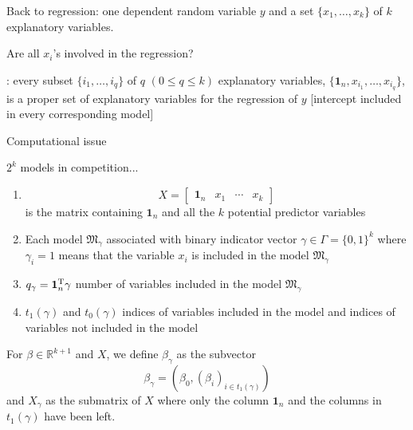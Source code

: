\begin{slide}

Back to regression: one dependent random variable $y$ and a set 
$\{x_1,\ldots,x_k\}$ of $k$ explanatory variables.

\pause
\vs{} Are all $x_i$'s involved in the regression?

\pause
{}: every subset $\{i_1,\ldots,i_q\}$ of 
$q$ $(0\le q\le k)$ explanatory variables, $\{\mathbf{1}_n,x_{i_1},
\ldots,x_{i_q}\}$, is a proper set of explanatory variables for the regression of $y$
[intercept included in every corresponding model] 

\pause
\begin{block}{Computational issue} 
\centerline{$2^k$ models in competition...}
\end{block}

\end{slide}\begin{slide}

\begin{enumerate}
\item $$
X=\left[\begin{matrix}\mathbf{1}_n &x_1 &\cdots &x_k \end{matrix}\right]
$$
is the matrix containing $\mathbf{1}_n$ and all the $k$ potential predictor variables

\item Each model $\mathfrak{M}_\gamma$ associated with binary indicator vector 
$\gamma\in\Gamma=\{0,1\}^k$ where $\gamma_i=1$ means that the variable $x_i$ is included in 
the model $\mathfrak{M}_\gamma$

\item $q_\gamma = \mathbf{1}_n^{\mathrm{T}} \gamma$ number of variables included in the model $\mathfrak{M}_\gamma$

\item $t_1(\gamma)$ and $t_0(\gamma)$ indices of 
variables included in the model and indices of variables not included in the model
\end{enumerate}

\end{slide}\begin{slide}

For $\beta\in\mathbb{R}^{k+1}$ and $X$, 
we define $\beta_\gamma$ as the subvector
$$
\beta_{\gamma}=\left(\beta_0,\left(\beta_i\right)_{i\in t_1(\gamma)}\right)
$$ 
and $X_{\gamma}$ as the submatrix of $X$ where only the column $\mathbf{1}_n$ 
and the columns in $t_1(\gamma)$ have been left.


\end{slide}
